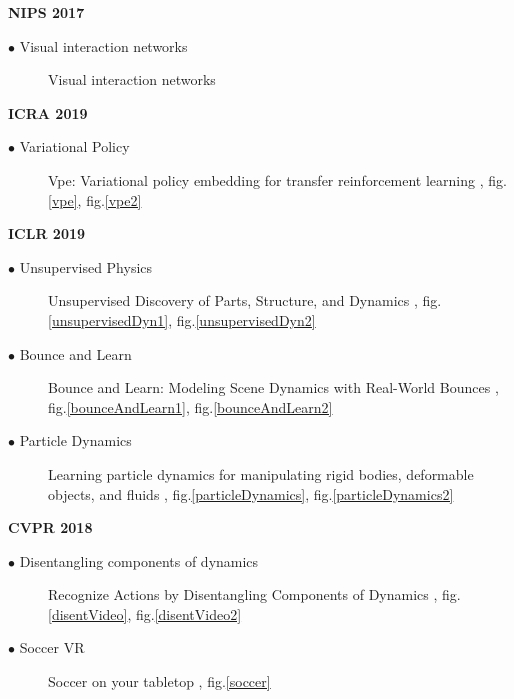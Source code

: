 \documentclass[12pt]{article}
\begin{document}
 {\LARGE\noindent\textbf{NIPS 2017}}
\begin{description}
  \item[$\bullet$ Visual interaction networks] Visual interaction networks \cite{watters2017visual}

\end{description}

 {\LARGE\noindent\textbf{ICRA 2019}}
\begin{description}
  \item[$\bullet$ Variational Policy] Vpe: Variational policy embedding for
    transfer reinforcement learning \cite{arnekvist2018vpe}, fig.\ref{vpe}, fig.\ref{vpe2}

\end{description}







 {\LARGE\noindent\textbf{ICLR 2019}}
\begin{description}
  \item[$\bullet$ Unsupervised Physics] Unsupervised Discovery of Parts, Structure, and Dynamics
\cite{xu2019unsupervised}, fig.\ref{unsupervisedDyn1}, fig.\ref{unsupervisedDyn2}
  \item[$\bullet$ Bounce and Learn] Bounce and Learn: Modeling Scene Dynamics with Real-World Bounces
\cite{purushwalkam2019bounce}, fig.\ref{bounceAndLearn1},
fig.\ref{bounceAndLearn2}
  \item[$\bullet$ Particle Dynamics] Learning particle dynamics for manipulating
    rigid bodies, deformable objects, and fluids \cite{li2018learning}, fig.\ref{particleDynamics}, fig.\ref{particleDynamics2}

\end{description}



 {\LARGE\noindent\textbf{CVPR 2018}}
\begin{description}
  \item[$\bullet$ Disentangling components of dynamics] Recognize Actions by
    Disentangling Components of Dynamics \cite{Zhao_2018_CVPR},
    fig.\ref{disentVideo}, fig.\ref{disentVideo2}
  \item[$\bullet$ Soccer VR] Soccer on your tabletop \cite{rematas2018soccer},
    fig.\ref{soccer}
\end{description}
\end{document}
